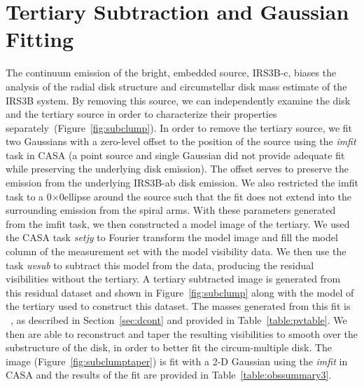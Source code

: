 \section{Tertiary Subtraction and Gaussian Fitting}\label{sec:tertsub}
The continuum emission of the bright, embedded source, IRS3B-c, biases the analysis of the radial disk structure and circumstellar disk mass estimate of the IRS3B system. By removing this source, we can independently examine the disk and the tertiary source in order to characterize their properties separately~(Figure~\ref{fig:subclump}). In order to remove the tertiary source, we fit two Gaussians with a zero-level offset to the position of the source using the \textit{imfit} task in CASA (a point source and single Gaussian did not provide adequate fit while preserving the underlying disk emission). The offset serves to preserve the emission from the underlying IRS3B-ab disk emission. We also restricted the imfit task to a 0$\times$0\space ellipse around the source such that the fit does not extend into the surrounding emission from the spiral arms. With these parameters generated from the imfit task, we then constructed a model image of the tertiary. We used the CASA task \textit{setjy} to Fourier transform the model image and fill the model column of the measurement set with the model visibility data. We then use the task \textit{uvsub} to subtract this model from the data, producing the residual visibilities without the tertiary. A tertiary subtracted image is generated from this residual dataset and shown in Figure~\ref{fig:subclump} along with the model of the tertiary used to construct this dataset. The masses generated from this fit is ~\solm, as described in Section~\ref{sec:dcont} and provided in Table~\ref{table:pvtable}. We then are able to reconstruct and taper the resulting visibilities to smooth over the substructure of the disk, in order to better fit the circum-multiple disk. The image (Figure~\ref{fig:subclumptaper}) is fit with a 2-D Gaussian using the \textit{imfit} in CASA and the results of the fit are provided in Table~\ref{table:obssummary3}.

